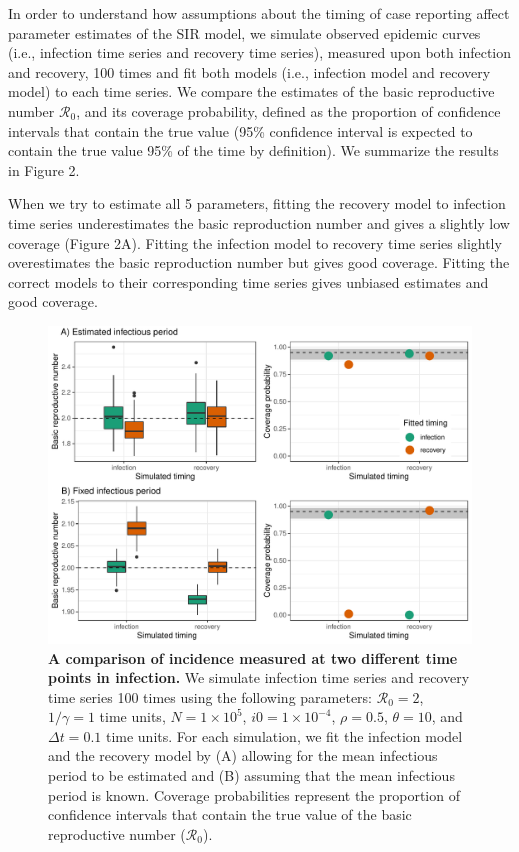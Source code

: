 \documentclass{article}\usepackage[]{graphicx}\usepackage[]{color}
\begin{document}
In order to understand how assumptions about the timing of case reporting affect 
parameter estimates of the SIR model, we simulate observed epidemic curves 
(i.e., infection time series and recovery time series), measured upon both infection and
recovery, 100 times and fit both models (i.e., infection model and recovery model) to each 
time series. We compare the estimates of the basic reproductive number $\mathcal R_0$,
and its coverage probability, defined as the proportion of confidence intervals that
contain the true value (95\% confidence interval is expected to contain the true value
95\% of the time by definition). We summarize the results in Figure 2.

When we try to estimate all 5 parameters, fitting the recovery model to
infection time series underestimates the basic reproduction number and 
gives a slightly low coverage (Figure 2A). Fitting the infection model to recovery
time series slightly overestimates the basic reproduction number but gives 
good coverage. Fitting the correct models to their corresponding time series
gives unbiased estimates and good coverage.

\begin{figure}
\includegraphics[width=\textwidth]{../figure/compare_deterministic.pdf}
\caption{
\textbf{A comparison of incidence measured at two different time points in infection.}
We simulate infection time series and recovery time series 100 times using the 
following parameters:  
$\mathcal R_0 = 2$, $1/\gamma = 1$ time units, $N = 1 \times 10^5$, $i0 = 1 \times 10^{-4}$,
$\rho = 0.5$, $\theta = 10$, and $\Delta t = 0.1$ time units.
For each simulation, we fit the infection model and the recovery model by
(A) allowing for the mean infectious period to be estimated and (B) assuming
that the mean infectious period is known.
Coverage probabilities represent the proportion of confidence intervals
that contain the true value of the basic reproductive number ($\mathcal R_0$).
}
\end{figure}
\end{document}
